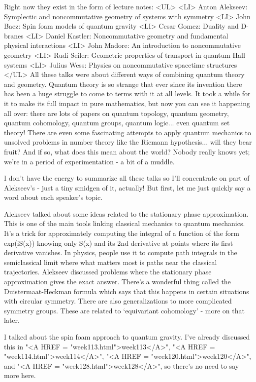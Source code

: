 Right now they exist in the form of lecture notes:
<UL>
<LI>
Anton Alekseev: Symplectic and noncommutative geometry of systems with symmetry
<LI>
John Baez: Spin foam models of quantum gravity
<LI>
Cesar Gomez: Duality and D-branes
<LI>
Daniel Kastler: Noncommutative geometry and fundamental physical interactions
<LI>
John Madore: An introduction to noncommutative geometry
<LI>
Rudi Seiler: Geometric properties of transport in quantum Hall systems
<LI>
Julius Wess:   Physics on noncommutative spacetime structures
</UL>
All these talks were about different ways of combining quantum theory
and geometry.  Quantum theory is so strange that ever since its
invention there has been a huge struggle to come to terms with it at all
levels.  It took a while for it to make its full impact in pure
mathematics, but now you can see it happening all over: there are lots
of papers on quantum topology, quantum geometry, quantum cohomology,
quantum groups, quantum logic... even quantum set theory!  There are
even some fascinating attempts to apply quantum mechanics to unsolved
problems in number theory like the Riemann hypothesis... will they bear
fruit?  And if so, what does this mean about the world?  Nobody really
knows yet; we're in a period of experimentation - a bit of a muddle.

I don't have the energy to summarize all these talks so I'll concentrate
on part of Alekseev's - just a tiny smidgen of it, actually!  But first,
let me just quickly say a word about each speaker's topic.

Alekseev talked about some ideas related to the stationary phase
approximation.  This is one of the main tools linking classical
mechanics to quantum mechanics.  It's a trick for approximately
computing the integral of a function of the form exp(iS(x)) knowing only
S(x) and its 2nd derivative at points where its first derivative
vanishes.  In physics, people use it to compute path integrals in the
semiclassical limit where what matters most is paths near the classical
trajectories.   Alekseev discussed problems where the stationary phase
approximation gives the exact answer.  There's a wonderful thing called
the Duistermaat-Heckman formula which says that this happens in certain
situations with circular symmetry.  There are also generalizations to
more complicated symmetry groups.  These are related to `equivariant
cohomology' - more on that later.

I talked about the spin foam approach to quantum gravity.  I've already
discussed this in "<A HREF = "week113.html">week113</A>", "<A HREF = "week114.html">week114</A>", "<A HREF = "week120.html">week120</A>", and "<A HREF = "week128.html">week128</A>", so
there's no need to say more here.

